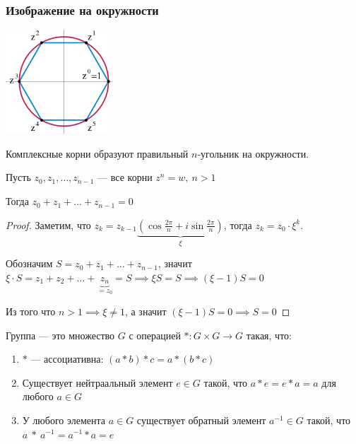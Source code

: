\subsubsection*{Изображение на окружности}

\begin{center}
    \includegraphics[width=0.3\textwidth]{images/complexroot.png}
\end{center}

Комплексные корни образуют правильный $n$-угольник на окружности.

\begin{lemma}
    Пусть $z_0, z_1, \ldots, z_{n - 1}$ --- все корни $z^n = w,~n > 1$

    Тогда $z_0 + z_1 + \ldots + z_{n - 1} = 0$
\end{lemma}

\begin{proof}

    Заметим, что $z_k = z_{k - 1} \underbrace{\left( \cos \frac{2 \pi}{n} + i \sin \frac{2 \pi}{n} \right)}_{\xi}$, тогда $z_k = z_0 \cdot \xi^k$.

    Обозначим $S = z_0 + z_1 + \ldots + z_{n - 1}$, значит $\xi \cdot S = z_1 + z_2 + \ldots + \underbrace{z_n}_{= z_0} = S \implies \xi S = S \implies (\xi - 1) S = 0$

    Из того что $n > 1 \implies \xi \neq 1$, а значит $(\xi - 1)S = 0 \implies S = 0$
\end{proof}

\begin{defn}
    Группа --- это множество $G$ с операцией $*: G \times G \to G$ такая, что:
    
    \begin{enumerate}
        \item $*$ --- ассоциативна: $(a * b) * c = a * (b * c)$
        \item Существует нейтраальный элемент $e \in G$ такой, что $a * e = e * a = a$ для любого $a \in G$
        \item У любого элемента $a \in G$ существует обратный элемент $a^{-1} \in G$ такой, что $a~*~a^{-1} = a^{-1} * a = e$
    \end{enumerate}
\end{defn}

